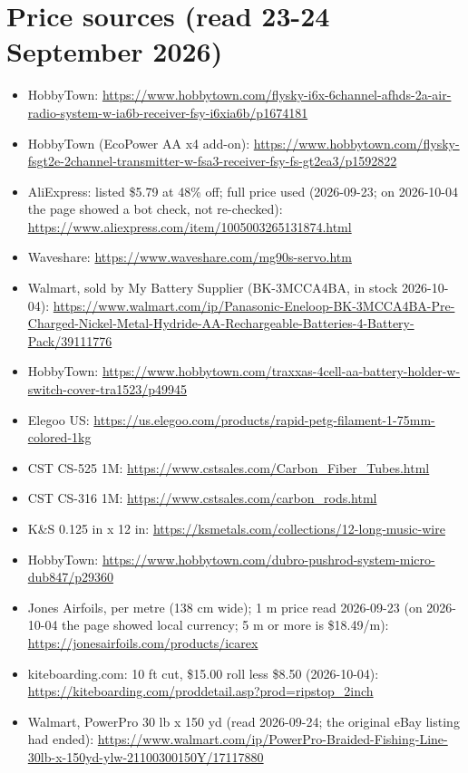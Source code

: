 \documentclass[11pt]{article}
\begin{document}
\section{Price sources (read 23-24 September 2026)}
{\small
\begin{itemize}
\item HobbyTown: \url{https://www.hobbytown.com/flysky-i6x-6channel-afhds-2a-air-radio-system-w-ia6b-receiver-fsy-i6xia6b/p1674181}
\item HobbyTown (EcoPower AA x4 add-on): \url{https://www.hobbytown.com/flysky-fsgt2e-2channel-transmitter-w-fsa3-receiver-fsy-fs-gt2ea3/p1592822}
\item AliExpress: listed \$5.79 at 48\% off; full price used (2026-09-23; on 2026-10-04 the page showed a bot check, not re-checked): \url{https://www.aliexpress.com/item/1005003265131874.html}
\item Waveshare: \url{https://www.waveshare.com/mg90s-servo.htm}
\item Walmart, sold by My Battery Supplier (BK-3MCCA4BA, in stock 2026-10-04): \url{https://www.walmart.com/ip/Panasonic-Eneloop-BK-3MCCA4BA-Pre-Charged-Nickel-Metal-Hydride-AA-Rechargeable-Batteries-4-Battery-Pack/39111776}
\item HobbyTown: \url{https://www.hobbytown.com/traxxas-4cell-aa-battery-holder-w-switch-cover-tra1523/p49945}
\item Elegoo US: \url{https://us.elegoo.com/products/rapid-petg-filament-1-75mm-colored-1kg}
\item CST CS-525 1M: \url{https://www.cstsales.com/Carbon_Fiber_Tubes.html}
\item CST CS-316 1M: \url{https://www.cstsales.com/carbon_rods.html}
\item K\&S 0.125 in x 12 in: \url{https://ksmetals.com/collections/12-long-music-wire}
\item HobbyTown: \url{https://www.hobbytown.com/dubro-pushrod-system-micro-dub847/p29360}
\item Jones Airfoils, per metre (138 cm wide); 1 m price read 2026-09-23 (on 2026-10-04 the page showed local currency; 5 m or more is \$18.49/m): \url{https://jonesairfoils.com/products/icarex}
\item kiteboarding.com: 10 ft cut, \$15.00 roll less \$8.50 (2026-10-04): \url{https://kiteboarding.com/proddetail.asp?prod=ripstop_2inch}
\item Walmart, PowerPro 30 lb x 150 yd (read 2026-09-24; the original eBay listing had ended): \url{https://www.walmart.com/ip/PowerPro-Braided-Fishing-Line-30lb-x-150yd-ylw-21100300150Y/17117880}

\end{itemize}}
\end{document}
